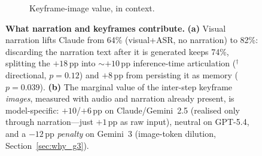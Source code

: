 \begin{figure}[t]
\begin{subfigure}{0.48\textwidth}
\caption{Keyframe-image value, in context.}
\label{fig:kfmodel}
\end{subfigure}
\caption{\textbf{What narration and keyframes contribute.}
\textbf{(a)} Visual narration lifts Claude from 64\% (visual+ASR, no narration) to
82\%: discarding the narration text after it is generated keeps 74\%, splitting
the $+18$\,pp into ${\sim}{+}10$\,pp inference-time articulation
($^\dagger$directional, $p{=}0.12$) and $+8$\,pp from persisting it as memory
($p{=}0.039$).
\textbf{(b)} The marginal value of the inter-step keyframe \emph{images}, measured
with audio and narration already present, is model-specific: $+10$/$+6$\,pp on
Claude/Gemini~2.5 (realised only through narration---just $+1$\,pp as raw input),
neutral on GPT-5.4, and a $-12$\,pp \emph{penalty} on Gemini~3 (image-token
dilution, Section~\ref{sec:why_g3}).}
\label{fig:analysis}
\end{figure}
